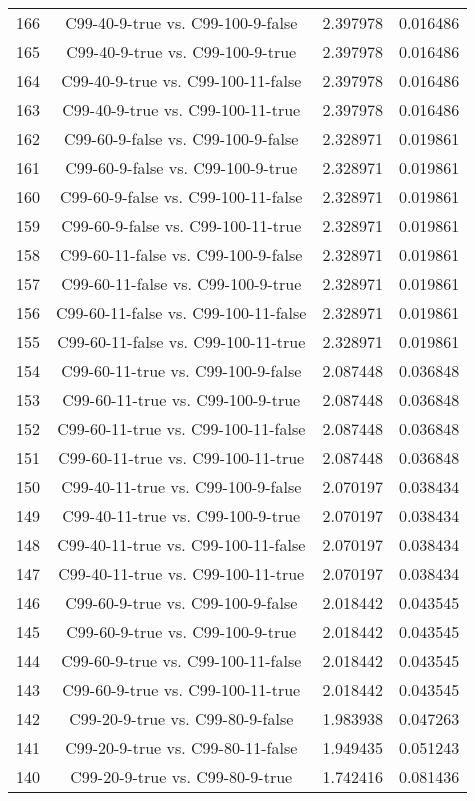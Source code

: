 \documentclass[a4paper,10pt]{article}
\begin{document}
\begin{landscape}
\begin{table}[!htp]
\begin{tabular}{cccc}
166&C99-40-9-true vs. C99-100-9-false&2.397978&0.016486\\
165&C99-40-9-true vs. C99-100-9-true&2.397978&0.016486\\
164&C99-40-9-true vs. C99-100-11-false&2.397978&0.016486\\
163&C99-40-9-true vs. C99-100-11-true&2.397978&0.016486\\
162&C99-60-9-false vs. C99-100-9-false&2.328971&0.019861\\
161&C99-60-9-false vs. C99-100-9-true&2.328971&0.019861\\
160&C99-60-9-false vs. C99-100-11-false&2.328971&0.019861\\
159&C99-60-9-false vs. C99-100-11-true&2.328971&0.019861\\
158&C99-60-11-false vs. C99-100-9-false&2.328971&0.019861\\
157&C99-60-11-false vs. C99-100-9-true&2.328971&0.019861\\
156&C99-60-11-false vs. C99-100-11-false&2.328971&0.019861\\
155&C99-60-11-false vs. C99-100-11-true&2.328971&0.019861\\
154&C99-60-11-true vs. C99-100-9-false&2.087448&0.036848\\
153&C99-60-11-true vs. C99-100-9-true&2.087448&0.036848\\
152&C99-60-11-true vs. C99-100-11-false&2.087448&0.036848\\
151&C99-60-11-true vs. C99-100-11-true&2.087448&0.036848\\
150&C99-40-11-true vs. C99-100-9-false&2.070197&0.038434\\
149&C99-40-11-true vs. C99-100-9-true&2.070197&0.038434\\
148&C99-40-11-true vs. C99-100-11-false&2.070197&0.038434\\
147&C99-40-11-true vs. C99-100-11-true&2.070197&0.038434\\
146&C99-60-9-true vs. C99-100-9-false&2.018442&0.043545\\
145&C99-60-9-true vs. C99-100-9-true&2.018442&0.043545\\
144&C99-60-9-true vs. C99-100-11-false&2.018442&0.043545\\
143&C99-60-9-true vs. C99-100-11-true&2.018442&0.043545\\
142&C99-20-9-true vs. C99-80-9-false&1.983938&0.047263\\
141&C99-20-9-true vs. C99-80-11-false&1.949435&0.051243\\
140&C99-20-9-true vs. C99-80-9-true&1.742416&0.081436\\

\end{tabular}
\end{table}
\end{landscape}
\end{document}
